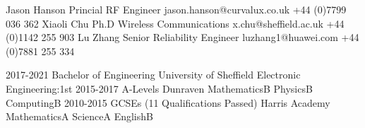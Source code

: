 \documentclass[9pt]{developercv} %
\begin{document}
	\begin{minipage}[t]{0.40\textwidth}%

		\halfentry
			{Jason Hanson}
			{Princial RF Engineer}
			{
				\hspace*{0.5cm}jason.hanson@curvalux.co.uk\newline
				\hspace*{0.5cm}+44 (0)7799 036 362\newline
			}
		\halfentry
			{Xiaoli Chu}
			{Ph.D Wireless Communications}
			{
				\hspace*{0.5cm}x.chu@sheffield.ac.uk\newline
				\hspace*{0.5cm}+44 (0)1142 255 903\newline\newline
			}
		\halfentry
			{Lu Zhang}
			{Senior Reliability Engineer}
			{	
				\hspace*{0.5cm}luzhang1@huawei.com\newline
				\hspace*{0.5cm}+44 (0)7881 255 334\newline
			}

		
	\end{minipage}
	\hspace*{0.5cm}
	\begin{minipage}[t]{0.57\textwidth}

		\halfentrydate
			{2017-2021}
			{Bachelor of Engineering}
			{University of Sheffield}
			{
				\hspace*{0.5cm}Electronic Engineering:\hfill1st\newline\newline
			}
		\halfentrydate
			{2015-2017}
			{A-Levels}
			{Dunraven}
			{
				\hspace*{0.5cm}Mathematics\hfill B\newline
				\hspace*{0.5cm}Physics\hfill B\newline
				\hspace*{0.5cm}Computing\hfill B\newline
			}
		\halfentrydate
			{2010-2015}
			{GCSEs (11 Qualifications Passed)}
			{Harris Academy}
			{
				\hspace*{0.5cm}Mathematics\hfill A\newline
				\hspace*{0.5cm}Science\hfill A\newline
				\hspace*{0.5cm}English\hfill B\newline
			}
	\end{minipage}%

	
\end{document}
